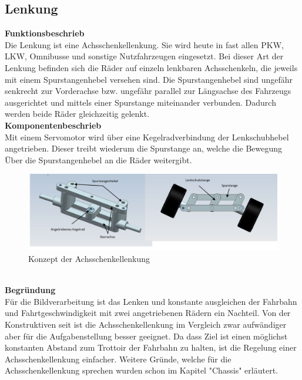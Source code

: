 \subsection{Lenkung}

\textbf{Funktionsbeschrieb}
\\[0.2cm]
Die Lenkung ist eine Achsschenkellenkung. Sie wird heute in fast allen PKW, LKW, Omnibusse und sonstige Nutzfahrzeugen eingesetzt. Bei dieser Art der Lenkung befinden sich die Räder auf einzeln lenkbaren Achsschenkeln, die jeweils mit einem Spurstangenhebel versehen sind. Die Spurstangenhebel sind ungefähr senkrecht zur Vorderachse bzw. ungefähr parallel zur Längsachse des Fahrzeugs ausgerichtet und mittels einer Spurstange miteinander verbunden. Dadurch werden beide Räder gleichzeitig gelenkt.\\[0.2cm]
\textbf{Komponentenbeschrieb}
\\[0.2cm]
Mit einem Servomotor wird über eine Kegelradverbindung der Lenkschubhebel angetrieben. Dieser treibt wiederum die Spurstange an, welche die Bewegung Über die Spurstangenhebel an die Räder weitergibt.\\[0.2cm]
\begin{figure}[H]%
\centering
\includegraphics[width=1\textwidth]{03_Loesungskonzept/pictures/Achsschenkellenkung.JPG}
\caption{Konzept der Achsschenkellenkung}
\label{fig:activityRoute}
\end{figure}\\
\textbf{Begründung}
\\[0.2cm]
Für die Bildverarbeitung ist das Lenken und konstante ausgleichen der Fahrbahn und Fahrtgeschwindigkeit mit zwei angetriebenen Rädern ein Nachteil. Von der Konstruktiven seit ist die Achsschenkellenkung im Vergleich zwar aufwändiger aber für die Aufgabenstellung besser geeignet. Da dass Ziel ist einen möglichst konstanten Abstand zum Trottoir der Fahrbahn zu halten, ist die Regelung einer Achsschenkellenkung einfacher. Weitere Gründe, welche für die Achsschenkellenkung sprechen wurden schon im Kapitel "Chassis" erläutert.

